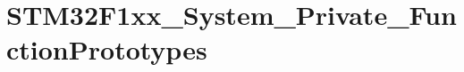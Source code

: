 \hypertarget{group___s_t_m32_f1xx___system___private___function_prototypes}{}\section{S\+T\+M32\+F1xx\+\_\+\+System\+\_\+\+Private\+\_\+\+Function\+Prototypes}
\label{group___s_t_m32_f1xx___system___private___function_prototypes}
